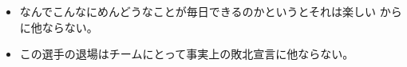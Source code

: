 \documentclass[
uplatex,
b5paper,
10pt,
dvipdfmx
]{jsbook}
\begin{document}
\begin{enumerate}
 \begin{itemize}
  \item なんでこんなにめんどうなことが毎日できるのかというとそれは楽しい
	からに他ならない。
  \item この選手の退場はチームにとって事実上の敗北宣言に他ならない。
 \end{itemize}


\end{enumerate}



%
%


%
\end{document}
